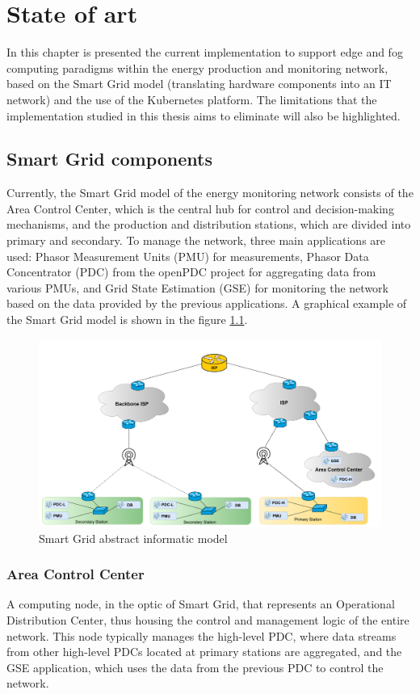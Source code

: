 \chapter{State of art}
In this chapter is presented the current implementation to support edge and fog computing paradigms within the energy production and monitoring network, based on the Smart Grid model (translating hardware components into an IT network) and the use of the Kubernetes platform. The limitations that the implementation studied in this thesis aims to eliminate will also be highlighted.

\section{Smart Grid components}
Currently, the Smart Grid model of the energy monitoring network consists of the Area Control Center, which is the central hub for control and decision-making mechanisms, and the production and distribution stations, which are divided into primary and secondary. To manage the network, three main applications are used: Phasor Measurement Units (PMU) for measurements, Phasor Data Concentrator (PDC) from the openPDC project for aggregating data from various PMUs, and Grid State Estimation (GSE) for monitoring the network based on the data provided by the previous applications. A graphical example of the Smart Grid model is shown in the figure \ref{fig:art-state}.
\begin{figure}[ht]\centering
\includegraphics[scale=0.17]{Pictures/state-of-art}
\caption{Smart Grid abstract informatic model}\label{fig:art-state}
\end{figure}

\subsection{Area Control Center}
A computing node, in the optic of Smart Grid, that represents an Operational Distribution Center, thus housing the control and management logic of the entire network. This node typically manages the high-level PDC, where data streams from other high-level PDCs located at primary stations are aggregated, and the GSE application, which uses the data from the previous PDC to control the network.

